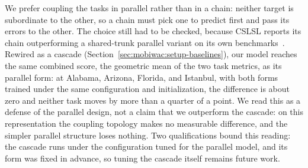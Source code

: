 
We prefer coupling the tasks in parallel rather than in a chain: neither target is
subordinate to the other, so a chain must pick one to predict first and pass its errors to the other. The choice still had to be checked, because CSLSL reports its chain outperforming a shared-trunk parallel variant on its own benchmarks~\cite{huang2024cslsl}. Rewired as a cascade
(Section~\ref{sec:mobiwac:setup-baselines}), our model reaches the same combined
score, the geometric mean of the two task metrics, as its parallel form: at Alabama, Arizona, Florida, and Istanbul, with both forms trained under the same configuration and initialization, the difference is about zero and neither task moves by more than a quarter of a point. We read this as a defense of the
parallel design, not a claim that we outperform the cascade: on this
representation the coupling topology makes no measurable difference, and the simpler parallel structure loses nothing. Two qualifications bound this
reading: the cascade runs under the configuration tuned for the parallel model, and
its form was fixed in advance, so tuning the cascade itself remains future work.

